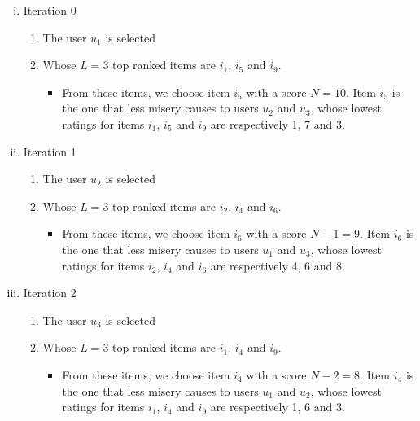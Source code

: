 \documentclass[]{article}
\begin{document}
\begin{enumerate}[i.]
\item
  Iteration 0

  \begin{enumerate}[1.]
  \item
    The user $u_{1}$ is selected
  \item
    Whose $L=3$ top ranked items are $i_{1}$, $i_{5}$ and $i_{9}$.

    \begin{itemize}
    \item
      From these items, we choose item $i_{5}$ with a score $N=10$. Item
      $i_{5}$ is the one that less misery causes to users $u_{2}$ and
      $u_{3}$, whose lowest ratings for items $i_{1}$, $i_{5}$ and
      $i_{9}$ are respectively 1, 7 and 3.
    \end{itemize}
  \end{enumerate}
\item
  Iteration 1

  \begin{enumerate}[1.]
  \item
    The user $u_{2}$ is selected
  \item
    Whose $L=3$ top ranked items are $i_{2}$, $i_{4}$ and $i_{6}$.

    \begin{itemize}
    \item
      From these items, we choose item $i_{6}$ with a score $N-1=9$.
      Item $i_{6}$ is the one that less misery causes to users $u_{1}$
      and $u_{3}$, whose lowest ratings for items $i_{2}$, $i_{4}$ and
      $i_{6}$ are respectively 4, 6 and 8.
    \end{itemize}
  \end{enumerate}
\item
  Iteration 2

  \begin{enumerate}[1.]
  \item
    The user $u_{3}$ is selected
  \item
    Whose $L=3$ top ranked items are $i_{1}$, $i_{4}$ and $i_{9}$.

    \begin{itemize}
    \item
      From these items, we choose item $i_{4}$ with a score $N-2=8$.
      Item $i_{4}$ is the one that less misery causes to users $u_{1}$
      and $u_{2}$, whose lowest ratings for items $i_{1}$, $i_{4}$ and
      $i_{9}$ are respectively 1, 6 and 3.
    \end{itemize}
  \end{enumerate}
\end{enumerate}
\end{document}

